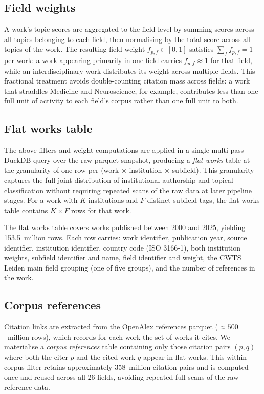 \subsection{Field weights}

A work's topic scores are aggregated to the field level by summing scores
across all topics belonging to each field, then normalising by the total score
across all topics of the work.  The resulting field weight $f_{p,f} \in [0,1]$
satisfies $\sum_f f_{p,f} = 1$ per work: a work appearing primarily in one
field carries $f_{p,f} \approx 1$ for that field, while an interdisciplinary
work distributes its weight across multiple fields.  This fractional treatment
avoids double-counting citation mass across fields: a work that straddles
Medicine and Neuroscience, for example, contributes less than one full unit of
activity to each field's corpus rather than one full unit to both.

\subsection{Flat works table}

The above filters and weight computations are applied in a single multi-pass
DuckDB query over the raw parquet snapshot, producing a \emph{flat works}
table at the granularity of one row per (work $\times$ institution $\times$
subfield).  This granularity captures the full joint distribution of
institutional authorship and topical classification without requiring repeated
scans of the raw data at later pipeline stages.  For a work with $K$
institutions and $F$ distinct subfield tags, the flat works table contains
$K \times F$ rows for that work.

The flat works table covers works published between 2000 and 2025, yielding
153.5~million rows.  Each row carries: work identifier, publication year,
source identifier, institution identifier, country code (ISO 3166-1), both
institution weights, subfield identifier and name, field identifier and weight,
the CWTS Leiden main field grouping (one of five groups), and the number of
references in the work.

\subsection{Corpus references}

Citation links are extracted from the OpenAlex references parquet
(${\approx}500$~million rows), which records for each work the set of works it
cites.  We materialise a \emph{corpus references} table containing only those
citation pairs $(p, q)$ where both the citer $p$ and the cited work $q$ appear
in flat works.  This within-corpus filter retains approximately 358~million
citation pairs and is computed once and reused across all 26 fields, avoiding
repeated full scans of the raw reference data.

